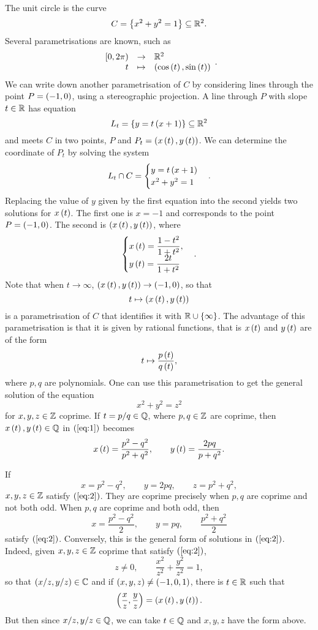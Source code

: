 \begin{example}
The unit circle is the curve
$$ C = \left\{ x^2 + y^2 = 1 \right\} \subseteq \mathbb{R}^2. $$
Several parametrisations are known, such as
$$ \function{[0, 2\pi)}{\R^2}{t}{\rb{\cos\rb{t}, \sin\rb{t}}}. $$
We can write down another parametrisation of $ C $ by considering lines through the point $ P = \left( -1, 0 \right) $, using a stereographic projection. A line through $ P $ with slope $ t \in \mathbb{R} $ has equation
$$ L_t = \left\{ y = t\left( x + 1 \right) \right\} \subseteq \mathbb{R}^2 $$
and meets $ C $ in two points, $ P $ and $ P_t = \left( x\left( t \right), y\left( t \right) \right) $. We can determine the coordinate of $ P_t $ by solving the system
$$ L_t \cap C =
\begin{cases}
y = t\left( x + 1 \right) \\
x^2 + y^2 = 1
\end{cases}.
$$
Replacing the value of $ y $ given by the first equation into the second yields two solutions for $ x\left( t \right) $. The first one is $ x = -1 $ and corresponds to the point $ P = \left( -1, 0 \right) $. The second is $ \left( x\left( t \right), y\left( t \right) \right) $, where
\begin{equation}
\label{eq:1}
\begin{cases}
x\left( t \right) = \dfrac{1 - t^2}{1 + t^2}, \\
y\left( t \right) = \dfrac{2t}{1 + t^2}
\end{cases}.
\end{equation}
Note that when $ t \to \infty $, $ \left( x\left( t \right), y\left( t \right) \right) \to \left( -1, 0 \right) $, so that
$$ t \mapsto \left( x\left( t \right), y\left( t \right) \right) $$
is a parametrisation of $ C $ that identifies it with $ \mathbb{R} \cup \left\{ \infty \right\} $. The advantage of this parametrisation is that it is given by rational functions, that is $ x\left( t \right) $ and $ y\left( t \right) $ are of the form
$$ t \mapsto \dfrac{p\left( t \right)}{q\left( t \right)}, $$
where $ p, q $ are polynomials. One can use this parametrisation to get the general solution of the equation
\begin{equation}
\label{eq:2}
x^2 + y^2 = z^2
\end{equation}
for $ x, y, z \in \mathbb{Z} $ coprime. If $ t = p / q \in \mathbb{Q} $, where $ p, q \in \mathbb{Z} $ are coprime, then $ x\left( t \right), y\left( t \right) \in \mathbb{Q} $ in $ \left( \ref{eq:1} \right) $ becomes
$$ x\left( t \right) = \dfrac{p^2 - q^2}{p^2 + q^2}, \qquad y\left( t \right) = \dfrac{2pq}{p + q^2}. $$

\pagebreak

If
$$ x = p^2 - q^2, \qquad y = 2pq, \qquad z = p^2 + q^2, $$
$ x, y, z \in \mathbb{Z} $ satisfy $ \left( \ref{eq:2} \right) $. They are coprime precisely when $ p, q $ are coprime and not both odd. When $ p, q $ are coprime and both odd, then
$$ x = \dfrac{p^2 - q^2}{2}, \qquad y = pq, \qquad \dfrac{p^2 + q^2}{2} $$
satisfy $ \left( \ref{eq:2} \right) $. Conversely, this is the general form of solutions in $ \left( \ref{eq:2} \right) $. Indeed, given $ x, y, z \in \mathbb{Z} $ coprime that satisfy $ \left( \ref{eq:2} \right) $,
$$ z \ne 0, \qquad \dfrac{x^2}{z^2} + \dfrac{y^2}{z^2} = 1, $$
so that $ \left( x / z, y / z \right) \in \mathbb{C} $ and if $ \left( x, y, z \right) \ne \left( -1, 0, 1 \right) $, there is $ t \in \mathbb{R} $ such that
$$ \left( \dfrac{x}{z}, \dfrac{y}{z} \right) = \left( x\left( t \right), y\left( t \right) \right). $$
But then since $ x / z, y / z \in \mathbb{Q} $, we can take $ t \in \mathbb{Q} $ and $ x, y, z $ have the form above.
\end{example}

